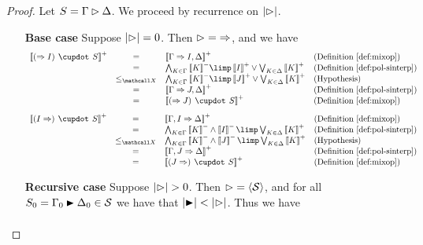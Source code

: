 \begin{proof}
  Let $S = \Gamma \J \Delta$. We proceed by recurrence on $\bradepth{\J}$.
  \begin{itemize}
    \item[\textbf{Base case}] Suppose $\bradepth{\J} = 0$. Then $\J = {\seq}$,
    and we have
    $$
    \begin{array}{rcll}
      \psint{(\seq I) \mix S}
      &=& \psint{\Gamma \seq I, \Delta} &\text{(\refdef{mixop})}\\
      &=& \bigwedge_{K \in \Gamma}{\nsint{K}} \limp \psint{I} \lor \bigvee_{K \in \Delta}{\psint{K}} &\text{(\refdef{pol-sinterp})}\\
      &\sementX& \bigwedge_{K \in \Gamma}{\nsint{K}} \limp \psint{J} \lor \bigvee_{K \in \Delta}{\psint{K}} &\text{(Hypothesis)}\\
      &=& \psint{\Gamma \seq J, \Delta} &\text{(\refdef{pol-sinterp})}\\
      &=& \psint{(\seq J) \mix S} &\text{(\refdef{mixop})}
    \end{array}
    $$
    $$
    \begin{array}{rcll}
      \psint{(I \seq) \mix S}
      &=& \psint{\Gamma, I \seq \Delta} &\text{(\refdef{mixop})}\\
      &=& \bigwedge_{K \in \Gamma}{\nsint{K}} \land \nsint{I} \limp \bigvee_{K \in \Delta}{\psint{K}} &\text{(\refdef{pol-sinterp})}\\
      &\sementX& \bigwedge_{K \in \Gamma}{\nsint{K}} \land \nsint{J} \limp \bigvee_{K \in \Delta}{\psint{K}} &\text{(Hypothesis)} \\
      &=& \psint{\Gamma, J \seq \Delta} &\text{(\refdef{pol-sinterp})}\\
      &=& \psint{(J \seq) \mix S} &\text{(\refdef{mixop})}
    \end{array}
    $$
    \item[\textbf{Recursive case}] Suppose $\bradepth{\J} > 0$. Then $\J =
    {\piq{\mathcal{S}}}$, and for all $S_0 = \Gamma_0 \JB \Delta_0 \in
    \mathcal{S}$ we have that $\bradepth{\JB} < \bradepth{\J}$. Thus we have
    $$
    \begin{array}{rcll}

\end{array}$$
\end{itemize}
\end{proof}
